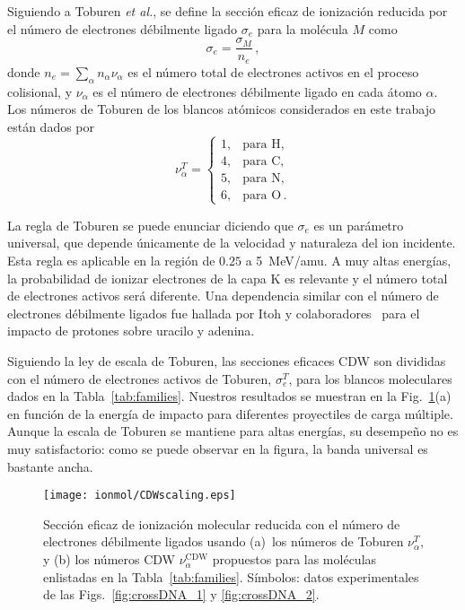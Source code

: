 Siguiendo a Toburen \textit{et al.}, se define la sección eficaz de 
ionización reducida por el número de electrones débilmente ligado 
$\sigma_e$ para la molécula $M$ como
\begin{equation}
\sigma_e=\frac{\sigma_M}{n_e}\,, 
\label{eq:cross-ne} 
\end{equation}
donde $n_e=\sum_{\alpha}n_{\alpha}\nu_{\alpha}$ es el número total de 
electrones activos en el proceso colisional, y $\nu_{\alpha}$ es el 
número de electrones débilmente ligado en cada átomo $\alpha$. Los 
números de Toburen de los blancos atómicos considerados en este trabajo 
están dados por 
\begin{equation}
\nu_{\alpha}^T=\left\{ 
\begin{array}{ll}
1, & \text{para H,} \\
4, & \text{para C,} \\ 
5, & \text{para N,} \\ 
6, & \text{para O}\,.
\end{array}\right.
\label{eq:neToburen} 
\end{equation} 

La regla de Toburen se puede enunciar diciendo que $\sigma_{e}$ es un 
parámetro universal, que depende únicamente de la velocidad y naturaleza
del ion incidente. Esta regla es aplicable en la región de $0.25$ a 
5~MeV/amu. A muy altas energías, la probabilidad de ionizar electrones 
de la capa K es relevante y el número total de electrones activos será 
diferente. Una dependencia similar con el número de electrones 
débilmente ligados fue hallada por Itoh y colaboradores~\cite{itoh2013} 
para el impacto de protones sobre uracilo y adenina.

Siguiendo la ley de escala de Toburen, las secciones eficaces CDW son 
divididas con el número de electrones activos de Toburen, 
$\sigma_{e}^T$, para los blancos moleculares dados en la 
Tabla~\ref{tab:families}. Nuestros resultados se muestran en la 
Fig.~\ref{fig:newscaling}(a) en función de la energía de impacto para 
diferentes proyectiles de carga múltiple. Aunque la escala de Toburen 
se mantiene para altas energías, su desempeño no es muy satisfactorio: 
como se puede observar en la figura, la banda universal es bastante 
ancha.

\begin{figure}[t]
\centering
\texttt{[image: ionmol/CDWscaling.eps]}
\caption[Sección eficaz de ionización molecular reducida por $n_e$.]
{Sección eficaz de ionización molecular reducida con el número de 
electrones débilmente ligados usando 
(a)~los números de Toburen $\nu_{\alpha}^T$, y 
(b) los números CDW $\nu_{\alpha}^{\text{CDW}}$ propuestos para las 
moléculas enlistadas en la Tabla~\ref{tab:families}. 
Símbolos: datos experimentales de las Figs.~\ref{fig:crossDNA_1} y 
\ref{fig:crossDNA_2}.}
\label{fig:newscaling}
\end{figure}

